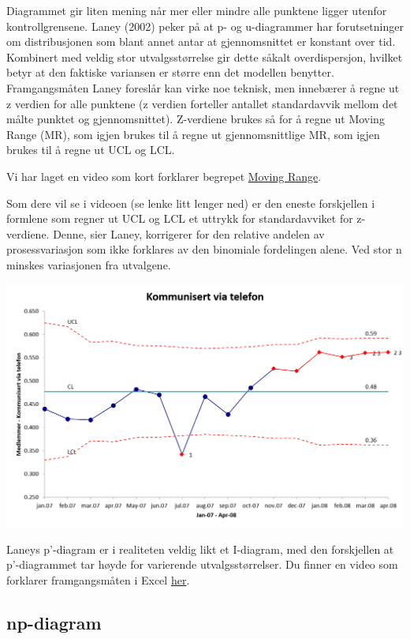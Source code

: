 \documentclass[
]{book}
\begin{document}
Diagrammet gir liten mening når mer eller mindre alle punktene ligger utenfor kontrollgrensene. Laney (2002) peker på at p- og u-diagrammer har forutsetninger om distribusjonen som blant annet antar at gjennomsnittet er konstant over tid. Kombinert med veldig stor utvalgsstørrelse gir dette såkalt overdispersjon, hvilket betyr at den faktiske variansen er større enn det modellen benytter. Framgangsmåten Laney foreslår kan virke noe teknisk, men innebærer å regne ut z verdien for alle punktene (z verdien forteller antallet standardavvik mellom det målte punktet og gjennomsnittet). Z-verdiene brukes så for å regne ut Moving Range (MR), som igjen brukes til å regne ut gjennomsnittlige MR, som igjen brukes til å regne ut UCL og LCL.

Vi har laget en video som kort forklarer begrepet \href{https://vimeo.com/626416062}{Moving Range}.

Som dere vil se i videoen (se lenke litt lenger ned) er den eneste forskjellen i formlene som regner ut UCL og LCL et uttrykk for standardavviket for z-verdiene. Denne, sier Laney, korrigerer for den relative andelen av prosessvariasjon som ikke forklares av den binomiale fordelingen alene. Ved stor n minskes variasjonen fra utvalgene.

\includegraphics{Laneyp.png}

Laneys p'-diagram er i realiteten veldig likt et I-diagram, med den forskjellen at p'-diagrammet tar høyde for varierende utvalgsstørrelser. Du finner en video som forklarer framgangsmåten i Excel \href{https://vimeo.com/622718116}{her}.

\hypertarget{np-diagram}{%
\subsection{np-diagram}\label{np-diagram}}
\end{document}
